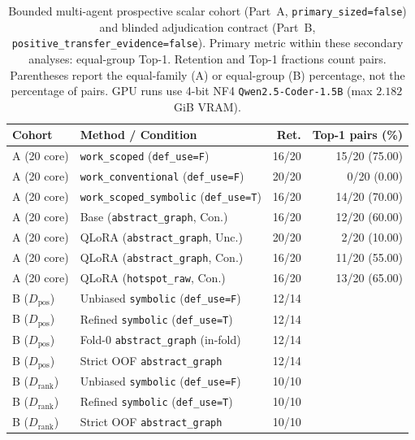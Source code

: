 \begin{table}[t]
\centering\scriptsize
\setlength{\tabcolsep}{2pt}
\caption{Bounded multi-agent prospective scalar cohort (Part~A, \texttt{primary\_sized=false}) and blinded adjudication contract (Part~B, \texttt{positive\_transfer\_evidence=false}). Primary metric within these secondary analyses: equal-group Top-1. Retention and Top-1 fractions count pairs. Parentheses report the equal-family (A) or equal-group (B) percentage, not the percentage of pairs. GPU runs use 4-bit NF4 \texttt{Qwen2.5-Coder-1.5B} (max $2.182$\,GiB VRAM).}
\label{tab:prospective-multiagent}
\begin{tabular}{@{}llrr@{}}
\toprule
Cohort & Method / Condition & Ret. & Top-1 pairs (\%) \\
\midrule
A (20 core) & \texttt{work\_scoped} (\texttt{def\_use=F}) & 16/20 & 15/20 (75.00) \\
A (20 core) & \texttt{work\_conventional} (\texttt{def\_use=F}) & 20/20 & 0/20 (0.00) \\
A (20 core) & \texttt{work\_scoped\_symbolic} (\texttt{def\_use=T}) & 16/20 & 14/20 (70.00) \\
A (20 core) & Base (\texttt{abstract\_graph}, Con.) & 16/20 & 12/20 (60.00) \\
A (20 core) & QLoRA (\texttt{abstract\_graph}, Unc.) & 20/20 & 2/20 (10.00) \\
A (20 core) & QLoRA (\texttt{abstract\_graph}, Con.) & 16/20 & 11/20 (55.00) \\
A (20 core) & QLoRA (\texttt{hotspot\_raw}, Con.) & 16/20 & 13/20 (65.00) \\
\midrule
B ($D_{\mathrm{pos}}$) & Unbiased \texttt{symbolic} (\texttt{def\_use=F}) & 12/14 & \GroupedPartBPositiveUnbiased{} \\
B ($D_{\mathrm{pos}}$) & Refined \texttt{symbolic} (\texttt{def\_use=T}) & 12/14 & \GroupedPartBPositiveRefined{} \\
B ($D_{\mathrm{pos}}$) & Fold-0 \texttt{abstract\_graph} (in-fold) & 12/14 & \GroupedPartBPositiveFold{} \\
B ($D_{\mathrm{pos}}$) & Strict OOF \texttt{abstract\_graph} & 12/14 & \GroupedPartBPositiveOOF{} \\
B ($D_{\mathrm{rank}}$) & Unbiased \texttt{symbolic} (\texttt{def\_use=F}) & 10/10 & \GroupedPartBMultiUnbiased{} \\
B ($D_{\mathrm{rank}}$) & Refined \texttt{symbolic} (\texttt{def\_use=T}) & 10/10 & \GroupedPartBMultiRefined{} \\
B ($D_{\mathrm{rank}}$) & Strict OOF \texttt{abstract\_graph} & 10/10 & \GroupedPartBMultiOOF{} \\
\bottomrule
\end{tabular}
\end{table}
